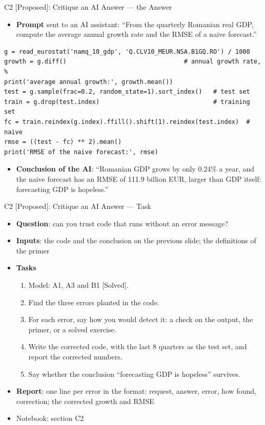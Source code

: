 \begin{frame}[fragile]{C2 [Proposed]: Critique an AI Answer --- the Answer}
\itemsize{\footnotesize}
\begin{itemize}
    \item \textbf{Prompt} sent to an AI assistant: ``From the quarterly Romanian real GDP, compute the average annual growth rate and the RMSE of a naive forecast.''
\end{itemize}
\begin{lstlisting}
g = read_eurostat('namq_10_gdp', 'Q.CLV10_MEUR.NSA.B1GQ.RO') / 1000
growth = g.diff()                                # annual growth rate, %
print('average annual growth:', growth.mean())
test = g.sample(frac=0.2, random_state=1).sort_index()   # test set
train = g.drop(test.index)                               # training set
fc = train.reindex(g.index).ffill().shift(1).reindex(test.index)  # naive
rmse = ((test - fc) ** 2).mean()
print('RMSE of the naive forecast:', rmse)
\end{lstlisting}
\begin{itemize}
    \item \textbf{Conclusion of the AI}: ``Romanian GDP grows by only 0.24\% a year, and the naive forecast has an RMSE of 111.9 billion EUR, larger than GDP itself: forecasting GDP is hopeless.''
\end{itemize}
\end{frame}

\begin{frame}{C2 [Proposed]: Critique an AI Answer --- Task}
\itemsize{\small}
\begin{itemize}
\item \textbf{Question}: can you trust code that runs without an error message?
\item \textbf{Inputs}: the code and the conclusion on the previous slide; the definitions of the primer
\item \textbf{Tasks}
\begin{enumerate}
    \item Model: A1, A3 and B1 [Solved].
    \item Find the three errors planted in the code.
    \item For each error, say how you would detect it: a check on the output, the primer, or a solved exercise.
    \item Write the corrected code, with the last 8 quarters as the test set, and report the corrected numbers.
    \item Say whether the conclusion ``forecasting GDP is hopeless'' survives.
\end{enumerate}
\item \textbf{Report}: one line per error in the format: request, answer, error, how found, correction; the corrected growth and RMSE
\item Notebook: section C2
\end{itemize}
\end{frame}

